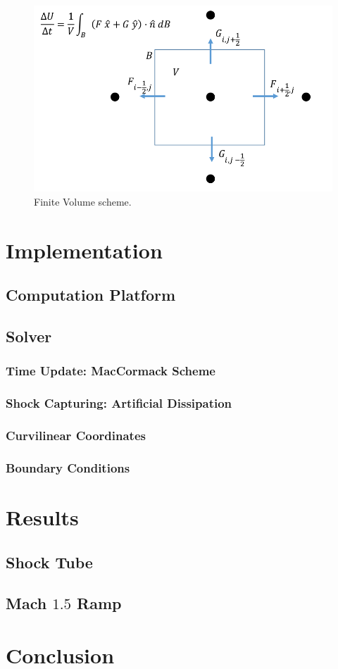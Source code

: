 \documentclass[paper=a4, fontsize=11pt]{scrartcl}
\numberwithin{equation}{section}        %
\numberwithin{figure}{section}          %
\numberwithin{table}{section}               %
\begin{document}
\begin{figure}[H]
    \centering
    \includegraphics[width = 0.8 \textwidth]{figures/finite_volume.png}
    \caption{Finite Volume scheme.}
    \label{fig:finite_volume}
\end{figure}

\section{Implementation}
\subsection{Computation Platform}

\subsection{Solver}
\subsubsection{Time Update: MacCormack Scheme}

\subsubsection{Shock Capturing: Artificial Dissipation}

\subsubsection{Curvilinear Coordinates}

\subsubsection{Boundary Conditions}


\section{Results}
\subsection{Shock Tube}

\subsection{Mach $1.5$ Ramp}

\section{Conclusion}
\end{document}
